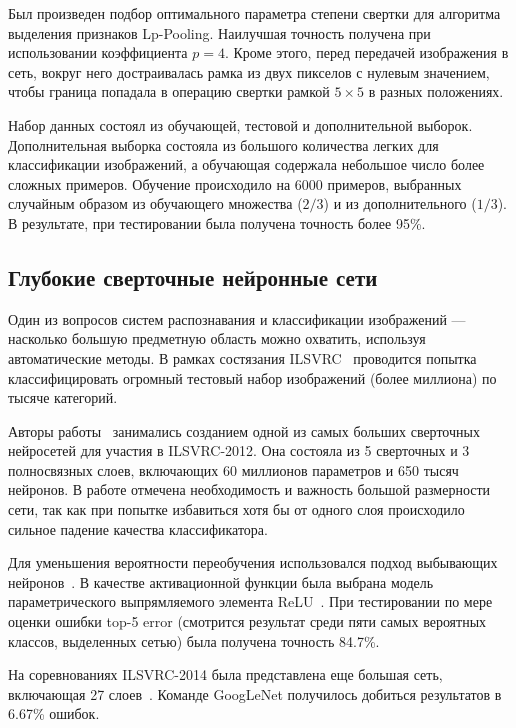 \documentclass[a4paper,14pt]{extarticle} %
\begin{document}
Был произведен подбор оптимального параметра степени свертки для алгоритма выделения признаков Lp-Pooling. Наилучшая точность получена при использовании коэффициента $p=4$. Кроме этого, перед передачей изображения в сеть, вокруг него достраивалась рамка из двух пикселов с нулевым значением, чтобы граница попадала в операцию свертки рамкой $5 \times 5$ в разных положениях.

Набор данных состоял из обучающей, тестовой и дополнительной выборок. Дополнительная выборка состояла из большого количества легких для классификации изображений, а обучающая содержала небольшое число более сложных примеров. Обучение происходило на 6000 примеров, выбранных случайным образом из обучающего множества ($2/3$) и из дополнительного ($1/3$). В результате, при тестировании была получена точность более 95\%.

\subsection{Глубокие сверточные нейронные сети}
\hspace{\parindent} Один из вопросов систем распознавания и классификации изображений --- насколько большую предметную область можно охватить, используя автоматические методы. В рамках состязания ILSVRC~\cite{ILSVRC} проводится попытка классифицировать огромный тестовый набор изображений (более миллиона) по тысяче категорий.

Авторы работы~\cite{krizhevsky2012imagenet} занимались созданием одной из самых больших сверточных нейросетей для участия в ILSVRC-2012. Она состояла из 5 сверточных и 3 полносвязных слоев, включающих 60 миллионов параметров и 650 тысяч нейронов. В работе отмечена необходимость и важность большой размерности сети, так как при попытке избавиться хотя бы от одного слоя происходило сильное падение качества классификатора. 

Для уменьшения вероятности переобучения использовался подход выбывающих нейронов~\cite{srivastava2014dropout}. В качестве активационной функции была выбрана модель параметрического выпрямляемого элемента ReLU~\cite{dahl2013improving}. При тестировании по мере оценки ошибки top-5 error (смотрится результат среди пяти самых вероятных классов, выделенных сетью) была получена точность 84.7\%.

На соревнованиях ILSVRC-2014 была представлена еще большая сеть, включающая 27 слоев~\cite{szegedy2014going}. Команде GoogLeNet получилось добиться результатов в 6.67\% ошибок.
\end{document}
